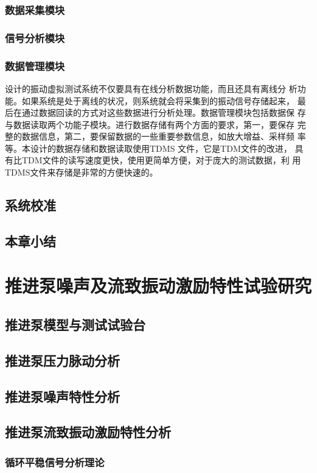 \subsection{数据采集模块}
\subsection{信号分析模块}
\subsection{数据管理模块}
设计的振动虚拟测试系统不仅要具有在线分析数据功能，而且还具有离线分
析功能。如果系统是处于离线的状况，则系统就会将采集到的振动信号存储起来，
最后在通过数据回读的方式对这些数据进行分析处理。数据管理模块包括数据保
存与数据读取两个功能子模块。进行数据存储有两个方面的要求，第一，要保存
完整的数据信息，第二，要保留数据的一些重要参数信息，如放大增益、采样频
率等。本设计的数据存储和数据读取使用TDMS  文件，它是TDM文件的改进，
具有比TDM文件的读写速度更快，使用更简单方便，对于庞大的测试数据，利
用TDMS文件来存储是非常的方便快速的。

\section{系统校准}
\section{本章小结}

\chapter{推进泵噪声及流致振动激励特性试验研究}
\section{推进泵模型与测试试验台}
\section{推进泵压力脉动分析}
\section{推进泵噪声特性分析}
\section{推进泵流致振动激励特性分析}
\subsection{循环平稳信号分析理论}
